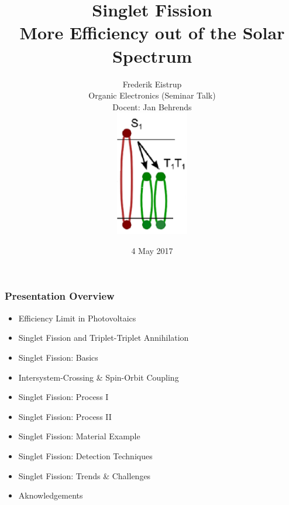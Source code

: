 \documentclass[compress]{beamer}
\title[Short title]{Singlet Fission\\
\small{More Efficiency out of the Solar Spectrum}}
\author[Grupo B4]{Frederik Eistrup\\ Organic Electronics (Seminar Talk)\\ Docent: Jan Behrends\\ \includegraphics[width=0.15\columnwidth]{../img/SF_linda.pdf}\\
} %
\date{4 May 2017}
\institute[FUB]{\vspace{-10pt}Freie Universität Berlin}
\begin{document}
\begin{frame}
\titlepage
\end{frame}



\begin{frame}
  \frametitle{Presentation Overview}

  \begin{itemize}
	\item Efficiency Limit in Photovoltaics
	\item Singlet Fission and Triplet-Triplet Annihilation
	\item Singlet Fission: Basics
	\item Intersystem-Crossing \& Spin-Orbit Coupling
	\item Singlet Fission: Process I
	\item Singlet Fission: Process II
	\item Singlet Fission: Material Example
	\item Singlet Fission: Detection Techniques
	\item Singlet Fission: Trends \& Challenges
	\item Aknowledgements
  \end{itemize}


\end{frame}
\end{document}
